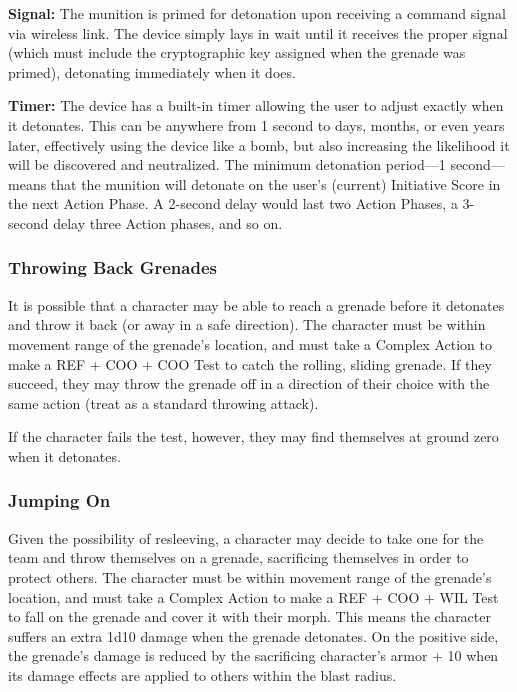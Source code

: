 \textbf{Signal:} The munition is primed for detonation upon 
receiving a command signal via wireless link. The 
device simply lays in wait until it receives the proper 
signal (which must include the cryptographic key 
assigned when the grenade was primed), detonating 
immediately when it does.

\textbf{Timer:} The device has a built-in timer allowing 
the user to adjust exactly when it detonates. This 
can be anywhere from 1 second to days, months, or 
even years later, effectively using the device like a 
bomb, but also increasing the likelihood it will be 
discovered and neutralized. The minimum detonation
period—1 second—means that the munition will
detonate on the user's (current) Initiative Score in the 
next Action Phase. A 2-second delay would last two 
Action Phases, a 3-second delay three Action phases, 
and so on.

\subsubsection{Throwing Back Grenades}

It is possible that a character may be able to reach 
a grenade before it detonates and throw it back (or 
away in a safe direction). The character must be 
within movement range of the grenade's location, and 
must take a Complex Action to make a REF + COO + 
COO Test to catch the rolling, sliding grenade. If they 
succeed, they may throw the grenade off in a direction
of their choice with the same action (treat as a
standard throwing attack).

If the character fails the test, however, they may find 
themselves at ground zero when it detonates.

\subsubsection{Jumping On}

Given the possibility of resleeving, a character may 
decide to take one for the team and throw themselves 
on a grenade, sacrificing themselves in order to protect 
others. The character must be within movement range 
of the grenade's location, and must take a Complex 
Action to make a REF + COO + WIL Test to fall on 
the grenade and cover it with their morph. This means 
the character suffers an extra 1d10 damage when the 
grenade detonates. On the positive side, the grenade's 
damage is reduced by the sacrificing character's armor 
+ 10 when its damage effects are applied to others 
within the blast radius.

